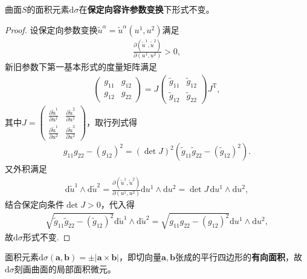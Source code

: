 \documentclass[../../main.tex]{subfiles}%
\begin{document}
\begin{proposition}
曲面$S$的面积元素$\mathrm{d}\sigma$在\textbf{保定向容许参数变换}下形式不变。
\end{proposition}
\begin{proof}

设保定向参数变换$\tilde{u}^\alpha=\tilde{u}^\alpha(u^1,u^2)$满足
\begin{align*}
\frac{\partial(\tilde{u}^1,\tilde{u}^2)}{\partial(u^1,u^2)}>0,
\end{align*}
新旧参数下第一基本形式的度量矩阵满足
\begin{align*}
\begin{pmatrix}g_{11}&g_{12}\\g_{12}&g_{22}\end{pmatrix}=J\begin{pmatrix}\tilde{g}_{11}&\tilde{g}_{12}\\\tilde{g}_{12}&\tilde{g}_{22}\end{pmatrix}J^\mathrm{T},
\end{align*}
其中$J=\begin{pmatrix}\frac{\partial\tilde{u}^1}{\partial u^1}&\frac{\partial\tilde{u}^2}{\partial u^1}\\\frac{\partial\tilde{u}^1}{\partial u^2}&\frac{\partial\tilde{u}^2}{\partial u^2}\end{pmatrix}$，取行列式得
\begin{align*}
g_{11}g_{22}-(g_{12})^2=(\det J)^2(\tilde{g}_{11}\tilde{g}_{22}-(\tilde{g}_{12})^2).
\end{align*}
又外积满足
\begin{align*}
\mathrm{d}\tilde{u}^1\wedge\mathrm{d}\tilde{u}^2=\frac{\partial(\tilde{u}^1,\tilde{u}^2)}{\partial(u^1,u^2)}\mathrm{d}u^1\wedge\mathrm{d}u^2=\det J\,\mathrm{d}u^1\wedge\mathrm{d}u^2,
\end{align*}
结合保定向条件$\det J>0$，代入得
\begin{align*}
\sqrt{\tilde{g}_{11}\tilde{g}_{22}-(\tilde{g}_{12})^2}\mathrm{d}\tilde{u}^1\wedge\mathrm{d}\tilde{u}^2=\sqrt{g_{11}g_{22}-(g_{12})^2}\mathrm{d}u^1\wedge\mathrm{d}u^2,
\end{align*}
故$\mathrm{d}\sigma$形式不变.

\end{proof}

\begin{remark}
面积元素$\mathrm{d}\sigma(\boldsymbol{a},\boldsymbol{b})=\pm|\boldsymbol{a}\times\boldsymbol{b}|$，即切向量$\boldsymbol{a},\boldsymbol{b}$张成的平行四边形的\textbf{有向面积}，故$\mathrm{d}\sigma$刻画曲面的局部面积微元。
\end{remark}
\end{document}
